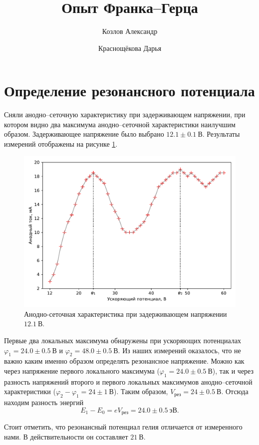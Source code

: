 \documentclass[12pt]{article}
\title{Опыт Франка\---Герца}
\author{Козлов Александр \and Краснощёкова Дарья}
\begin{document}
	\maketitle
	\section{Определение резонансного потенциала}
	Сняли анодно\---сеточную характеристику при задерживающем напряжении, при котором видно два максимума анодно\---сеточной характеристики наилучшим образом. Задерживающее напряжение было выбрано $12.1 \pm 0.1\ \text{В}$. Результаты измерений отображены на рисунке \ref{fig:figure1}.
	\begin{figure}[htbp]
		\centering
		\includegraphics[width=\linewidth]{../plots/1}
		\caption{Анодно-сеточная характеристика при задерживающем напряжении $12.1\ \text{В}$.}
		\label{fig:figure1}
	\end{figure}
	Первые два локальных максимума обнаружены при ускоряющих потенциалах $\varphi_1=24.0\pm0.5\ \text{В}$ и $\varphi_2=48.0\pm0.5\ \text{В}$. Из наших измерений оказалось, что не важно каким именно образом определять резонансное напряжение. Можно как через напряжение первого локального максимума ($\varphi_1=24.0\pm0.5\ \text{В}$), так и через разность напряжений второго и первого локальных максимумов анодно\---сеточной характеристики ($\varphi_2 - \varphi_1 = 24\pm1\ \text{В}$). Таким образом, $V_\text{рез} = 24\pm0.5\ \text{В}$. Отсюда находим разность энергий
	\begin{equation}
			E_1 - E_0 = eV_\text{рез} = 24.0\pm0.5\ \text{эВ}.
	\end{equation}
	\par Стоит отметить, что резонансный потенциал гелия отличается от измеренного нами. В действительности он составляет $21\ \text{В}$.
\end{document}
